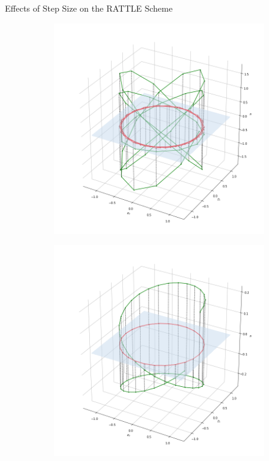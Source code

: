 \documentclass[10pt]{beamer}
\begin{document}
\begin{frame}[fragile]{Effects of Step Size on the RATTLE Scheme}

    \begin{figure}
        \begin{subfigure}[b]{0.32\textwidth}
            \includegraphics[width=\textwidth]{traj_0.5.png}
        \end{subfigure}%
        \begin{subfigure}[b]{0.32\textwidth}
            \includegraphics[width=\textwidth]{traj_0.1.png}

\end{subfigure}
\end{figure}
\end{frame}
\end{document}
